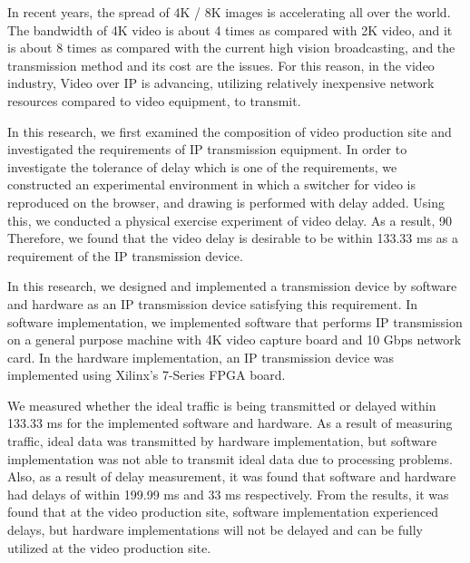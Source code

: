 \begin{eabstract}

In recent years, the spread of 4K / 8K images is accelerating all over the world.
The bandwidth of 4K video is about 4 times as compared with 2K video, and it is about 8 times as compared with the current high vision broadcasting, and the transmission method and its cost are the issues.
For this reason, in the video industry, Video over IP is advancing, utilizing relatively inexpensive network resources compared to video equipment, to transmit.

In this research, we first examined the composition of video production site and investigated the requirements of IP transmission equipment.
In order to investigate the tolerance of delay which is one of the requirements, we constructed an experimental environment in which a switcher for video is reproduced on the browser, and drawing is performed with delay added.
Using this, we conducted a physical exercise experiment of video delay. As a result, 90%
Therefore, we found that the video delay is desirable to be within 133.33 ms as a requirement of the IP transmission device.

In this research, we designed and implemented a transmission device by software and hardware as an IP transmission device satisfying this requirement.
In software implementation, we implemented software that performs IP transmission on a general purpose machine with 4K video capture board and 10 Gbps network card.
In the hardware implementation, an IP transmission device was implemented using Xilinx's 7-Series FPGA board.

We measured whether the ideal traffic is being transmitted or delayed within 133.33 ms for the implemented software and hardware.
As a result of measuring traffic, ideal data was transmitted by hardware implementation, but software implementation was not able to transmit ideal data due to processing problems.
Also, as a result of delay measurement, it was found that software and hardware had delays of within 199.99 ms and 33 ms respectively.
From the results, it was found that at the video production site, software implementation experienced delays, but hardware implementations will not be delayed and can be fully utilized at the video production site.

\end{eabstract}
